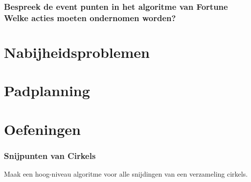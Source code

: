 \documentclass[12pt,a4paper]{article}
\begin{document}
\section{Bespreek de event punten in het algoritme van Fortune Welke acties moeten ondernomen worden?}
\fi

\part{Nabijheidsproblemen}
\iffalse
\section{wat betekent volgende uitspraak: probleem A is ?(N) transformeerbaar tot probleem B? waarvoor kan een dergelijke uitspraak nuttig gebruikt worden + vb}
\section{wat is een EMDB van een vz punten + verband met Voronoi diagramma van een vz punten?}
\section{bespreek beknopt hoe een EMDB van een vz punten kan berkend worden in O(nlogn) bewerkingen}
\fi

\part{Padplanning}
\iffalse
\section{Hoe bepaal je het gebied dat kan bereikt worden door een robotarm met 3 segmenten. Is de volgorde van de stukken belangrijk?}
\section{Geef en bespreek de minkovski-som met een voorbeeld.}
\fi
\fi

\part{Oefeningen}


\iffalse
\section{Snijpunten van Cirkels}
Maak een hoog-niveau algoritme voor alle snijdingen van een verzameling cirkels. 
\end{document}
